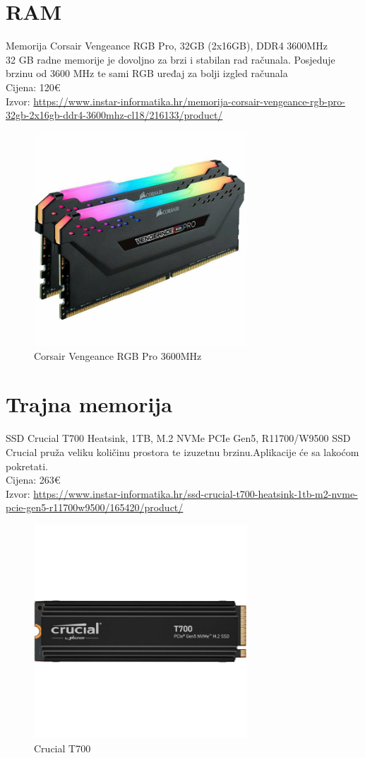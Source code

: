 \documentclass{report}
\begin{document}
\chapter{RAM}
Memorija Corsair Vengeance RGB Pro, 32GB (2x16GB), DDR4 3600MHz
\\32 GB radne memorije je dovoljno za brzi i stabilan rad računala. Posjeduje brzinu od 3600 MHz te sami RGB uređaj za bolji izgled računala 
\\Cijena: 120€
\\Izvor:  \url{https://www.instar-informatika.hr/memorija-corsair-vengeance-rgb-pro-32gb-2x16gb-ddr4-3600mhz-cl18/216133/product/}
\begin{figure}[h]
\includegraphics[width=8cm]{slike/ram.jpg}
\caption{Corsair Vengeance RGB Pro 3600MHz}
\end{figure}

\chapter{Trajna memorija}
SSD Crucial T700 Heatsink, 1TB, M.2 NVMe PCIe Gen5, R11700/W9500
SSD Crucial pruža veliku količinu prostora te izuzetnu brzinu.Aplikacije će sa lakoćom pokretati.
\\Cijena: 263€
\\Izvor:  \url{https://www.instar-informatika.hr/ssd-crucial-t700-heatsink-1tb-m2-nvme-pcie-gen5-r11700w9500/165420/product/}
\begin{figure}[h]
\includegraphics[width=8cm]{slike/ssd.jpg}
\caption{Crucial T700}
\end{figure}
\end{document}
